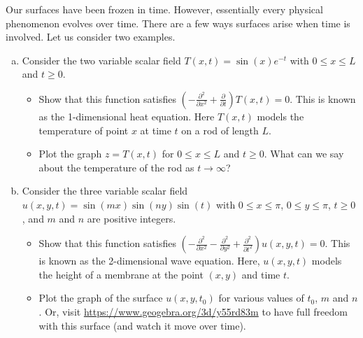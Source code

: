 \documentclass[12pt]{article} %
\begin{document}
\newpage
\begin{problem}
    Our surfaces have been frozen in time.  However, essentially every physical phenomenon evolves over time.  There are a few ways surfaces arise when time is involved.  Let us consider two examples.
    \begin{enumerate}[(a)]
        \item Consider the two variable scalar field $T(x,t) = \sin(x)e^{-t}$ with $0\leq x \leq L$ and $t\geq 0$. 
        \begin{itemize}
            \item Show that this function satisfies $\left(-\frac{\partial^2}{\partial x^2} + \frac{\partial}{\partial t}\right) T(x,t)=0$. This is known as the 1-dimensional heat equation. Here $T(x,t)$ models the temperature of point $x$ at time $t$ on a rod of length $L$.
            \item Plot the graph $z=T(x,t)$ for $0\leq x \leq L$ and $t\geq 0$.  What can we say about the temperature of the rod as $t\to \infty$?
        \end{itemize}
        \item Consider the three variable scalar field $u(x,y,t) = \sin(mx)\sin(ny)\sin(t)$ with $0\leq x \leq \pi$, $0\leq y \leq \pi$, $t\geq 0$, and $m$ and $n$ are positive integers.
        \begin{itemize}
            \item Show that this function satisfies $\left(-\frac{\partial^2}{\partial x^2}-\frac{\partial^2}{\partial y^2} + \frac{\partial^2}{\partial t^2}\right)u(x,y,t) = 0.$ This is known as the 2-dimensional wave equation. Here, $u(x,y,t)$ models the height of a membrane at the point $(x,y)$ and time $t$.
            \item Plot the graph of the surface $u(x,y,t_0)$ for various values of $t_0$, $m$ and $n$.  Or, visit \url{https://www.geogebra.org/3d/y55rd83m} to have full freedom with this surface (and watch it move over time).
        \end{itemize}
    \end{enumerate}
\end{problem}
\begin{solution}

\end{solution}

\newpage
\end{document}
